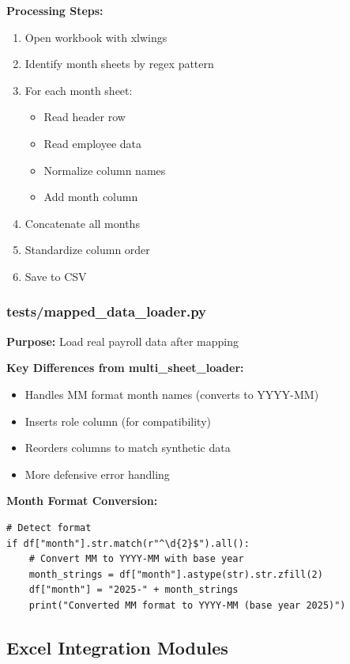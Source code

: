 \textbf{Processing Steps:}
\begin{enumerate}
    \item Open workbook with xlwings
    \item Identify month sheets by regex pattern
    \item For each month sheet:
    \begin{itemize}
        \item Read header row
        \item Read employee data
        \item Normalize column names
        \item Add month column
    \end{itemize}
    \item Concatenate all months
    \item Standardize column order
    \item Save to CSV
\end{enumerate}

\subsubsection{tests/mapped\_data\_loader.py}

\textbf{Purpose:} Load real payroll data after mapping

\textbf{Key Differences from multi\_sheet\_loader:}
\begin{itemize}
    \item Handles MM format month names (converts to YYYY-MM)
    \item Inserts role column (for compatibility)
    \item Reorders columns to match synthetic data
    \item More defensive error handling
\end{itemize}

\textbf{Month Format Conversion:}
\begin{lstlisting}[style=pythonstyle]
# Detect format
if df["month"].str.match(r"^\d{2}$").all():
    # Convert MM to YYYY-MM with base year
    month_strings = df["month"].astype(str).str.zfill(2)
    df["month"] = "2025-" + month_strings
    print("Converted MM format to YYYY-MM (base year 2025)")
\end{lstlisting}

\subsection{Excel Integration Modules}

